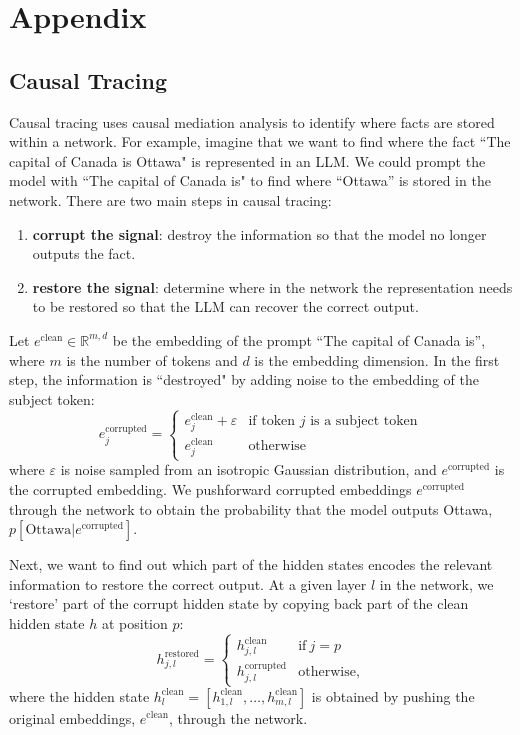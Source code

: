 \section{Appendix}

\subsection{Causal Tracing} \label{sec:causal_tracing}
Causal tracing \citep{meng2022locating, vig2020investigating} uses causal mediation analysis to identify where facts are stored within a network.
For example, imagine that we want to find where the fact ``The capital of Canada is Ottawa" is represented in an LLM. 
We could prompt the model with ``The capital of Canada is" to find where ``Ottawa'' is stored in the network.
There are two main steps in causal tracing:
\begin{enumerate}
    \item \textbf{corrupt the signal}: destroy the information so that the model no longer outputs the fact. 
    \item \textbf{restore the signal}: determine where in the network the representation needs to be restored so that the LLM can recover the correct output.
\end{enumerate}

Let $e^{\text{clean}} \in \mathbb{R}^{m,d}$ be the embedding of the prompt ``The capital of Canada is'', where $m$ is the number of tokens and $d$ is the embedding dimension. 
In the first step, the information is ``destroyed" by adding noise to the embedding of the subject token:
\begin{equation}
  e^{\text{corrupted}}_{j} =
    \begin{cases}
      e^{\text{clean}}_{j} + \varepsilon & \text{if token $j$ is a subject token}\\
      e^{\text{clean}}_{j} & \text{otherwise}
    \end{cases}       
\end{equation}
where $\varepsilon $ is noise sampled from an isotropic Gaussian distribution, and $e^{\text{corrupted}}$ is the corrupted embedding.
We pushforward corrupted embeddings $e^{\text{corrupted}}$ through the network to obtain the probability that the model outputs Ottawa, $p[\text{Ottawa}|e^{\text{corrupted}}]$.

Next, we want to find out which part of the hidden states encodes the relevant information to restore the correct output. 
At a given layer $l$ in the network, we `restore' part of the corrupt hidden state by copying back part of the clean hidden state $h$ at position $p$:
\begin{equation}
  h^{\text{restored}}_{j,l} =
    \begin{cases}
      h^{\text{clean}}_{j,l} & \text{if} \  j = p\\
      h^{\text{corrupted}}_{j,l} & \text{otherwise},
    \end{cases}       
\end{equation}
where the hidden state $h^{\text{clean}}_{l} = [h^{\text{clean}}_{1,l}, \dots, h^{\text{clean}}_{m,l}]$ is obtained by pushing the original embeddings, $e^{\text{clean}}$, through the network. 

